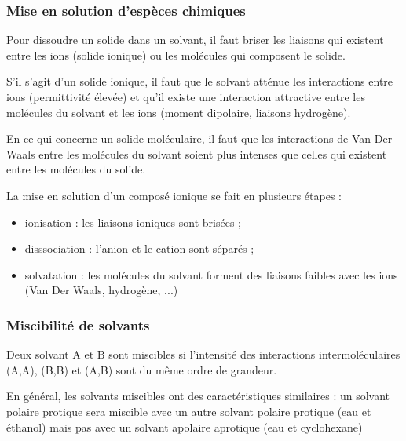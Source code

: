\documentclass{cours}
\begin{document}
\subsubsection{Mise en solution d'espèces chimiques}%
\label{ssub:mise_en_solution_d_especes_chimiques}
Pour dissoudre un solide dans un solvant, il faut briser les liaisons qui existent entre les ions (solide ionique) ou les molécules qui composent le solide.

S'il s'agit d'un solide ionique, il faut que le solvant atténue les interactions entre ions (permittivité élevée) et qu'il existe une interaction attractive entre les molécules du solvant et les ions (moment dipolaire, liaisons hydrogène).

En ce qui concerne un solide moléculaire, il faut que les interactions de Van Der Waals entre les molécules du solvant soient plus intenses que celles qui existent entre les molécules du solide.  

La mise en solution d'un composé ionique se fait en plusieurs étapes :
\begin{itemize}
  \item ionisation : les liaisons ioniques sont brisées ;
  \item disssociation : l'anion et le cation sont séparés ;
  \item solvatation : les molécules du solvant forment des liaisons faibles avec les ions (Van Der Waals, hydrogène, ...)
\end{itemize}

\subsubsection{Miscibilité de solvants}%
\label{ssub:miscibilite_de_solvants}
Deux solvant A et B sont miscibles si l'intensité des interactions intermoléculaires  (A,A), (B,B) et (A,B) sont du même ordre de grandeur.

En général, les solvants miscibles ont des caractéristiques similaires : un solvant polaire protique sera miscible avec un autre solvant polaire protique (eau et éthanol) mais pas avec un solvant apolaire aprotique (eau et cyclohexane)
\end{document}
